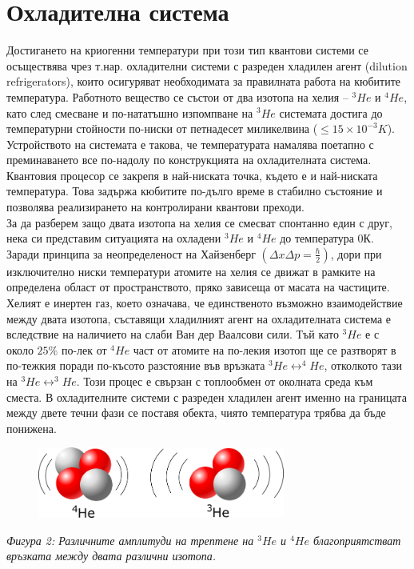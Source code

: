     \section{Охладителна система}

    \nocite{refrigeratorsuperconducting}
    Достигането на криогенни температури при този тип квантови системи се осъществява чрез т.нар. охладителни системи с разреден хладилен агент
    (dilution refrigerators), които осигуряват необходимата за правилната работа на кюбитите температура. Работното вещество
    се състои от два изотопа на хелия -- $^{3}He$ и $^{4}He$, като след смесване и по-нататъшно изпомпване на $^{3}He$ системата достига до температурни стойности
    по-ниски от петнадесет миликелвина ($\le 15 \times 10^{-3} K$). Устройството на системата е такова, че температурата намалява поетапно с преминаването все по-надолу по конструкцията на охладителната система.
    Квантовия процесор се закрепя в най-ниската точка, където е и най-ниската температура. Това задържа кюбитите по-дълго време в стабилно състояние и позволява реализирането на контролирани квантови преходи.\\
    За да разберем защо двата изотопа на хелия се смесват спонтанно един с друг, нека си представим ситуацията на охладени $^3He$ и $^4He$ до температура $0$К. Заради принципа за
    неопределеност на Хайзенберг $\left(\Delta x \Delta p = \frac{\hbar}{2}\right)$, дори при изключително ниски температури атомите на хелия се движат в рамките на определена област от пространството,
    пряко зависеща от масата на частиците. Хелият е инертен газ, което означава, че единственото възможно взаимодействие между двата изотопа, съставящи хладилният агент на охладителната
    система е вследствие на наличието на слаби Ван дер Ваалсови сили. Тъй като $^3He$ е с около $25\%$ по-лек от $^4He$ част от атомите на по-лекия изотоп ще се разтворят в по-тежкия поради по-късото разстояние във
    връзката $^3He \leftrightarrow ^4He$, отколкото тази на $^3He \leftrightarrow ^3He$. Този процес е свързан с топлообмен от околната среда към сместа. В охладителните системи с разреден хладилен агент именно на
    границата между двете течни фази се поставя обекта, чиято температура трябва да бъде понижена.

    \begin{figure}[H]
        \centering
        \includegraphics[width=230pt]{18.png}
    \end{figure}
    \begin{center}
        \small \textit{Фигура 2: Различните амплитуди на трептене на $^3He$ и $^4He$ благоприятстват връзката между двата различни изотопа.}
    \end{center}

